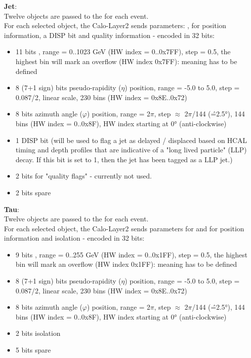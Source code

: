 \textbf{Jet}:\\ Twelve objects are passed to the \ugt for each event.\\
For each selected object, the Calo-Layer2 sends parameters: \pt, for position information, a DISP bit and quality information - encoded in 32 bits:
\begin{itemize}
\item 11 bits \pt, range = 0..1023 GeV (HW index = 0..0x7FF), step = 0.5, the highest bin will mark an overflow (HW index 0x7FF): meaning has to be defined
\item 8 (7+1 sign) bits pseudo-rapidity ($\eta$) position, range = -5.0 to 5.0, step = 0.087/2, linear scale, 230 bins (HW index = 0x8E..0x72)
\item 8 bits azimuth angle ($\varphi$) position, range = 2$\pi$, step $\approx$ 2$\pi$/144 (\^=2.5°), 144 bins (HW index = 0..0x8F), HW index starting at 0° (anti-clockwise)
\item 1 DISP bit (will be used to flag a jet as delayed / displaced based on HCAL timing and depth profiles that are indicative of a "long lived particle" (LLP) decay. If this bit is set to 1, then the jet has been tagged as a LLP jet.)
\item 2 bits for "quality flags" - currently not used.
\item 2 bits spare
\end{itemize}

\textbf{Tau}:\\ Twelve objects are passed to the \ugt for each event.\\
For each selected object, the Calo-Layer2 sends parameters for \pt and for position information and isolation - encoded in 32 bits:
\begin{itemize}
\item 9 bits \pt, range = 0..255 GeV (HW index = 0..0x1FF), step = 0.5, the highest bin will mark an overflow (HW index 0x1FF): meaning has to be defined
\item 8 (7+1 sign) bits pseudo-rapidity ($\eta$) position, range = -5.0 to 5.0, step = 0.087/2, linear scale, 230 bins (HW index = 0x8E..0x72)
\item 8 bits azimuth angle ($\varphi$) position, range = 2$\pi$, step $\approx$ 2$\pi$/144 (\^=2.5°), 144 bins (HW index = 0..0x8F), HW index starting at 0° (anti-clockwise)
\item 2 bits isolation
\item 5 bits spare
\end{itemize}

